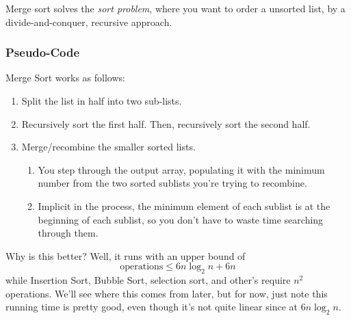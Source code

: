\documentclass[a4paper,12pt]{scrartcl}
\begin{document}
Merge sort solves the \emph{sort problem}, where you want to 
order a unsorted list, by a divide-and-conquer, recursive
approach.

\subsubsection{Pseudo-Code}
Merge Sort works as follows:
\begin{enumerate}
    \item Split the list in half into two sub-lists.
    \item Recursively sort the first half. Then, 
	recursively sort the second half.
    \item Merge/recombine the smaller sorted lists.
	\begin{enumerate}
	    \item You step through the output array, 
        populating it with the minimum 
        number from the two sorted sublists you're
        trying to recombine.
	    \item Implicit in the process, the minimum 
		element of each sublist is at the
		beginning of each sublist, so you don't
		have to waste time searching through them.
	\end{enumerate}
\end{enumerate}
Why is this better? Well, it runs with an upper bound
of 
    \[ \text{operations} \leq 6n \log_2 n + 6n \]
while Insertion Sort, Bubble Sort, selection sort, and 
other's require $n^2$ operations. We'll see where this comes 
from later, but for now, just note this running time
is pretty good, even though it's not quite linear since at $6n \log_2 n$.
\end{document}
